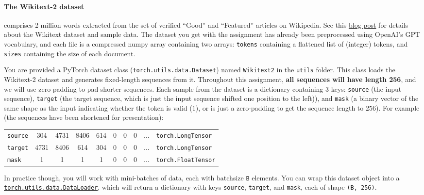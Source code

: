\documentclass[12pt]{article}
\begin{document}
\paragraph{The Wikitext-2 dataset} comprises 2 million words extracted from the set of verified ``Good'' and ``Featured'' articles on Wikipedia. See this \href{https://blog.einstein.ai/the-wikitext-long-term-dependency-language-modeling-dataset/}{blog post} for details about the Wikitext dataset and sample data. The dataset you get with the assignment has already been preprocessed using OpenAI's GPT vocabulary, and each file is a compressed numpy array containing two arrays: \texttt{tokens} containing a flattened list of (integer) tokens, and \texttt{sizes} containing the size of each document.

\noindent You are provided a PyTorch dataset class (\href{https://pytorch.org/docs/stable/data.html#torch.utils.data.Dataset}{\texttt{torch.utils.data.Dataset}}) named \texttt{Wikitext2} in the \texttt{utils} folder. This class loads the Wikitext-2 dataset and generates fixed-length sequences from it. Throughout this assignment, \textbf{all sequences will have length 256}, and we will use zero-padding to pad shorter sequences. Each sample from the dataset is a dictionary containing 3 keys: \texttt{source} (the input sequence), \texttt{target} (the target sequence, which is just the input sequence shifted one position to the left)), and \texttt{mask} (a binary vector of the same shape as the input indicating whether the token is valid ($1$), or is just a zero-padding to get the sequence length to $256$). For example (the sequences have been shortened for presentation):
\begin{table}[H]
    \centering
    \begin{tabular}{lccccccccl}
        \texttt{source} & 304 & 4731 & 8406 & 614 & 0 & 0 & 0 & $\ldots$ & \hspace{3em} \texttt{torch.LongTensor} \\
        \texttt{target} & 4731 & 8406 & 614 & 304 & 0 & 0 & 0 & $\ldots$ & \hspace{3em} \texttt{torch.LongTensor} \\
        \texttt{mask} & 1 & 1 & 1 & 1 & 0 & 0 & 0 & $\ldots$ & \hspace{3em} \texttt{torch.FloatTensor}
    \end{tabular}
    \label{tab:wikitext2-dataset}
\end{table}
\noindent In practice though, you will work with mini-batches of data, each with batchsize \texttt{B} elements. You can wrap this dataset object into a \href{https://pytorch.org/docs/stable/data.html#torch.utils.data.DataLoader}{\texttt{torch.utils.data.DataLoader}}, which will return a dictionary with keys \texttt{source}, \texttt{target}, and \texttt{mask}, each of shape \texttt{(B, 256)}.
\end{document}
